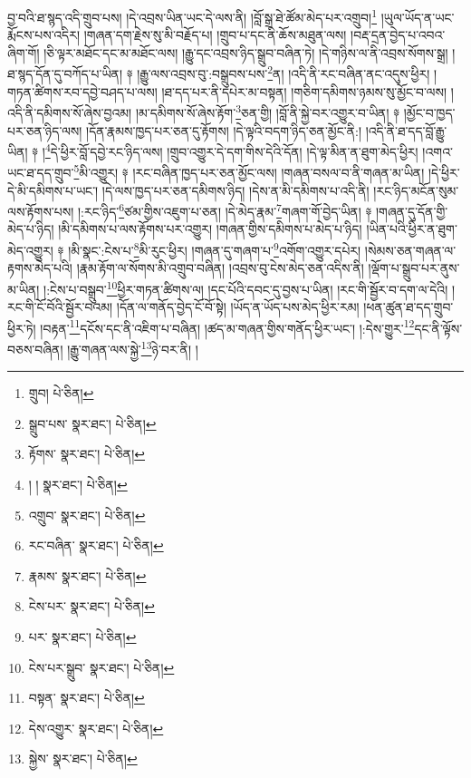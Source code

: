 བྱ་བའི་ཐ་སྙད་འདི་གྲུབ་པས། །དེ་འབྲས་ཡིན་ཡང་དེ་ལས་ནི། །བློ་སྒྲ་ཐེ་ཚོམ་མེད་པར་འགྲུབ།\footnote{གྲུབ།  པེ་ཅིན། } །ཡུལ་ཡོད་ན་ཡང་རྨོངས་པས་འདིར། །གཞན་དག་རྗེས་སུ་མི་བརྗོད་པ། །གྲུབ་པ་དང་ནི་ཆོས་མཐུན་ལས། །བརྡ་དྲན་བྱེད་པ་འབའ་ཞིག་གོ། །ཅི་ལྟར་མཐོང་དང་མ་མཐོང་ལས། །རྒྱུ་དང་འབྲས་ཉིད་སྒྲུབ་བཞིན་ཏེ། །དེ་གཉིས་ལ་ནི་འབྲས་སོགས་སྒྲ། །ཐ་སྙད་དོན་དུ་བཀོད་པ་ཡིན། ༈ །རྒྱུ་ལས་འབྲས་བུ་:བསྒྲུབས་པས་\footnote{སྒྲུབ་པས་  སྣར་ཐང་།  པེ་ཅིན། }ན། །འདི་ནི་རང་བཞིན་ནང་འདུས་ཕྱིར། །གཏན་ཚིགས་རབ་དབྱེ་བཤད་པ་ལས། །ཐ་དད་པར་ནི་དཔེར་མ་བསྟན། །གཅིག་དམིགས་ཉམས་སུ་མྱོང་བ་ལས། །འདི་ནི་དམིགས་སོ་ཞེས་བྱའམ། །མ་དམིགས་སོ་ཞེས་རྟོག་\footnote{རྟོགས་  སྣར་ཐང་།  པེ་ཅིན། }ཅན་གྱི། །བློ་ནི་སྐྱེ་བར་འགྱུར་བ་ཡིན། ༈ །མྱོང་བ་ཁྱད་པར་ཅན་ཉིད་ལས། །དོན་རྣམས་ཁྱད་པར་ཅན་དུ་རྟོགས། །དེ་ལྟའི་བདག་ཉིད་ཅན་མྱོང་ནི:། །འདི་ནི་ཐ་དད་བློ་རྒྱུ་ཡིན། ༈ །\footnote{། །  སྣར་ཐང་།  པེ་ཅིན། }དེ་ཕྱིར་བློ་དབྱེ་རང་ཉིད་ལས། །གྲུབ་འགྱུར་དེ་དག་གིས་དེའི་དོན། །དེ་ལྟ་མིན་ན་ཐུག་མེད་ཕྱིར། །འགའ་ཡང་ཐ་དད་གྲུབ་\footnote{འགྲུབ་  སྣར་ཐང་།  པེ་ཅིན། }མི་འགྱུར། ༈ །རང་བཞིན་ཁྱད་པར་ཅན་མྱོང་ལས། །གཞན་བསལ་བ་ནི་གཞན་མ་ཡིན། །དེ་ཕྱིར་དེ་མི་དམིགས་པ་ཡང་། །དེ་ལས་ཁྱད་པར་ཅན་དམིགས་ཉིད། །དེས་ན་མི་དམིགས་པ་འདི་ནི། །རང་ཉིད་མངོན་སུམ་ལས་རྟོགས་པས། །:རང་ཉིད་\footnote{རང་བཞིན་  སྣར་ཐང་།  པེ་ཅིན། }ཙམ་གྱིས་འཇུག་པ་ཅན། །དེ་མེད་རྣམ་\footnote{རྣམས་  སྣར་ཐང་།  པེ་ཅིན། }གཞག་གོ་བྱེད་ཡིན། ༈ །གཞན་དུ་དོན་གྱི་མེད་པ་ཉིད། །མི་དམིགས་པ་ལས་རྟོགས་པར་འགྱུར། །གཞན་གྱིས་དམིགས་པ་མེད་པ་ཉིད། །ཡིན་པའི་ཕྱིར་ན་ཐུག་མེད་འགྱུར། ༈ །མི་སྣང་:ངེས་པ་\footnote{ངེས་པར་  སྣར་ཐང་།  པེ་ཅིན། }མི་རུང་ཕྱིར། །གཞན་དུ་གཞག་པ་\footnote{པར་  སྣར་ཐང་།  པེ་ཅིན། }འགོག་འགྱུར་དཔེར། །སེམས་ཅན་གཞན་ལ་རྟགས་མེད་པའི། །རྣམ་རྟོག་ལ་སོགས་མི་འགྲུབ་བཞིན། །འབྲས་བུ་ངེས་མེད་ཅན་འདིས་ནི། །ལྡོག་པ་སྒྲུབ་པར་ནུས་མ་ཡིན། །:ངེས་པ་བསྒྲུབ་\footnote{ངེས་པར་སྒྲུབ་  སྣར་ཐང་།  པེ་ཅིན། }ཕྱིར་གཏན་ཚིགས་ལ། །དང་པོའི་དབང་དུ་བྱས་པ་ཡིན། །རང་གི་སྦྱོར་བ་དག་ལ་དེའི། །རང་གི་ངོ་བོའི་སྦྱོར་བའམ། །དོན་ལ་གནོད་བྱེད་ངོ་བོ་སྟེ། །ཡོད་ན་ཡོད་པས་མེད་ཕྱིར་རམ། །ཕན་ཚུན་ཐ་དད་གྲུབ་ཕྱིར་ཏེ། །བརྟན་\footnote{བསྟན་  སྣར་ཐང་།  པེ་ཅིན། }དངོས་དང་ནི་འཇིག་པ་བཞིན། །ཚད་མ་གཞན་གྱིས་གནོད་ཕྱིར་ཡང་། །:དེས་གྱུར་\footnote{དེས་འགྱུར་  སྣར་ཐང་།  པེ་ཅིན། }དང་ནི་ལྟོས་བཅས་བཞིན། །རྒྱུ་གཞན་ལས་སྐྱེ་\footnote{སྐྱེས་  སྣར་ཐང་།  པེ་ཅིན། }ཉེ་བར་ནི། །
